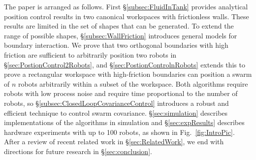 The paper is arranged as follows. First \S\ref{subsec:FluidInTank} provides analytical position control results in two canonical workspaces with frictionless walls.  These results are limited in the set of shapes that can be generated.  To extend the range of possible shapes, \S \ref{subsec:WallFriction} introduces general models for boundary interaction.  We prove that two orthogonal boundaries with high friction are sufficient to arbitrarily position two robots in \S \ref{sec:PostionControl2Robots}, and \S \ref{sec:PostionControlnRobots} extends this to prove a rectangular workspace with high-friction boundaries can position a swarm of $n$ robots arbitrarily within a subset of the workspace.
Both algorithms require robots with low process noise and require time proportional to the number of robots, so \S \ref{subsec:ClosedLoopCovarianceControl} introduces a robust and efficient technique to control swarm covariance.
\S \ref{sec:simulation} describes implementations of the algorithms in simulation and  \S \ref{sec:expResults} describes hardware experiments with up to 100 robots, as shown in Fig.~\ref{fig:IntroPic}. After a review of recent related work in \S \ref{sec:RelatedWork}, we end with directions for future research in \S \ref{sec:conclusion}.
